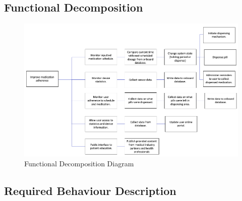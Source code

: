 \documentclass[12pt,titlepage]{article}
\begin{document}
\subsection{Functional Decomposition}
\begin{figure}[!htbp]
    \centering
    \includegraphics[width=\textwidth,height=\textheight,keepaspectratio]{FuncDecomp.png}
    \caption{Functional Decomposition Diagram}
    \label{fig:my_label}
\end{figure}


\pagebreak
\subsection{Required Behaviour Description}
\end{document}
